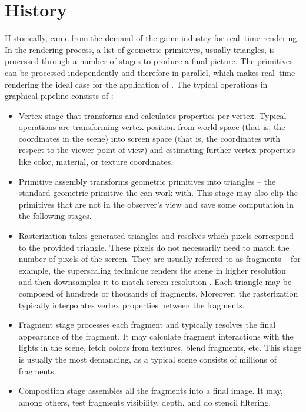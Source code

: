 \section{History}

Historically, \gpu came from the demand of the game industry for real--time rendering. In the rendering process, a list of geometric primitives, usually triangles, is processed through a number of stages to produce a final picture. The primitives can be processed independently and therefore in parallel, which makes real--time rendering the ideal case for the application of \gpuns. The typical operations in graphical pipeline consists of \citep{GPUComputingOwens}:
\begin{itemize}
    \item Vertex stage that transforms and calculates properties per vertex. Typical operations are transforming vertex position from world space (that is, the coordinates in the scene) into screen space (that is, the coordinates with respect to the viewer point of view) and estimating further vertex properties like color, material, or texture coordinates.
    \item Primitive assembly transforms geometric primitives into triangles -- the standard geometric primitive the \gpu can work with. This stage may also clip the primitives that are not in the observer's view and save some computation in the following stages.
    \item Rasterization takes generated triangles and resolves which pixels correspond to the provided triangle. These pixels do not necessarily need to match the number of pixels of the screen. They are usually referred to as fragments -- for example, the superscaling technique renders the scene in higher resolution and then downsamples it to match screen resolution \citep{GameGraphicProgramming}. Each triangle may be composed of hundreds or thousands of fragments. Moreover, the rasterization typically interpolates vertex properties between the fragments.
    \item Fragment stage processes each fragment and typically resolves the final appearance of the fragment. It may calculate fragment interactions with the lights in the scene, fetch colors from textures, blend fragments, etc. This stage is usually the most demanding, as a typical scene consists of millions of fragments.
    \item Composition stage assembles all the fragments into a final image. It may, among others, test fragments visibility, depth, and do stencil filtering.
\end{itemize}

